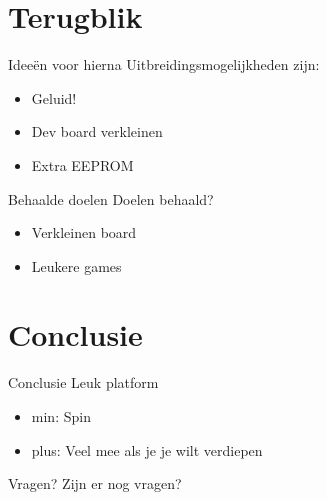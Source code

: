 \documentclass{beamer}
\begin{document}
\section{Terugblik}

\begin {frame}{Ideeën voor hierna}
	Uitbreidingsmogelijkheden zijn:
	\begin{itemize}
		\item
			Geluid!
			\pause
		\item
			Dev board verkleinen
			\pause
		\item
			Extra EEPROM
	\end{itemize}
\end{frame}

\begin{frame}{Behaalde doelen}
	Doelen behaald?
	\begin{itemize}
		\item
			Verkleinen board
			\pause
		\item
			Leukere games
	\end{itemize}
\end{frame}

\section{Conclusie}

\begin{frame}{Conclusie}
	Leuk platform
	\begin{itemize}
		\item
			min: Spin
			\pause
		\item
			plus: Veel mee als je je wilt verdiepen
	\end{itemize}
\end{frame}

\begin{frame}{Vragen?}
	Zijn er nog vragen?
\end{frame}
\end{document}
